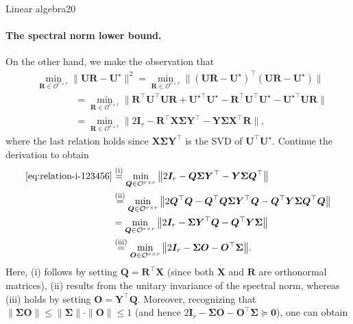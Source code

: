 \documentclass{article}
\begin{document}
\begin{problem}{Linear algebra}{20}
{\paragraph{The spectral norm lower bound.}
On the other hand, we make the observation that
%
\begin{align}
	& \min_{\bm{R}\in\mathcal{O}^{r\times r}}\big\|\bm{U}\bm{R}-\bm{U}^{\star}\big\|^{2}  =\min_{\bm{R}\in\mathcal{O}^{r\times r}}\big\|(\bm{U}\bm{R}-\bm{U}^{\star})^{\top}(\bm{U}\bm{R}-\bm{U}^{\star})\big\|\nonumber \\
 & \qquad\qquad =\min_{\bm{R}\in\mathcal{O}^{r\times r}}\big\|\bm{R}^{\top}\bm{U}^{\top}\bm{U}\bm{R}+\bm{U}^{\star\top}\bm{U}^{\star}-\bm{R}^{\top}\bm{U}^{\top}\bm{U}^{\star}-\bm{U}^{\star\top}\bm{U}\bm{R}\big\|\nonumber \\
 & \qquad\qquad{=}\min_{\bm{R}\in\mathcal{O}^{r\times r}}\big\|2\bm{I}_{r}-\bm{R}^{\top}\bm{X}\bm{\Sigma}\bm{Y}^{\top}-\bm{Y}\bm{\Sigma}\bm{X}^{\top}\bm{R}\big\|,
	\label{eq:relation-i-123456}
\end{align}
%
where the last relation holds since $\bm{X}\bm{\Sigma}\bm{Y}^{\top}$ is the
SVD of $\bm{U}^{\top}\bm{U}^{\star}$. Continue the derivation to obtain
%
\begin{align}
\eqref{eq:relation-i-123456}  & \overset{(\mathrm{i})}{=}\min_{\bm{Q}\in\mathcal{O}^{r\times r}}\big\|2\bm{I}_{r}-\bm{Q}\bm{\Sigma}\bm{Y}^{\top}-\bm{Y}\bm{\Sigma}\bm{Q}^{\top}\big\|\nonumber \\
 & \overset{(\mathrm{ii})}{=}\min_{\bm{Q}\in\mathcal{O}^{r\times r}}\big\|2\bm{Q}^{\top}\bm{Q}-\bm{Q}^{\top}\bm{Q}\bm{\Sigma}\bm{Y}^{\top}\bm{Q}-\bm{Q}^{\top}\bm{Y}\bm{\Sigma}\bm{Q}^{\top}\bm{Q}\big\|\nonumber \\
 &  =\min_{\bm{Q}\in\mathcal{O}^{r\times r}}\big\|2\bm{I}_{r}-\bm{\Sigma}\bm{Y}^{\top}\bm{Q}-\bm{Q}^{\top}\bm{Y}\bm{\Sigma}\big\|\nonumber \\
 &  \overset{(\mathrm{iii})}{=}\min_{\bm{O}\in\mathcal{O}^{r\times r}}\big\|2\bm{I}_{r}-\bm{\Sigma}\bm{O}-\bm{O}^{\top}\bm{\Sigma}\big\|.\label{eq:UR-Ustar-identity}
\end{align}
%
Here, (i) follows by setting $\bm{Q}=\bm{R}^{\top}\bm{X}$
(since both $\bm{X}$ and $\bm{R}$ are orthonormal matrices), (ii)
results from the unitary invariance of the spectral norm, whereas (iii) holds
by setting $\bm{O}=\bm{Y}^{\top}\bm{Q}$. Moreover, recognizing that
$\|\bm{\Sigma}\bm{O}\|\leq\|\bm{\Sigma}\| \cdot \|\bm{O}\|\leq1$ (and hence
$2\bm{I}_{r}-\bm{\Sigma}\bm{O}-\bm{O}^{\top}\bm{\Sigma}\succeq\bm{0}$),
one can obtain
}
\end{problem}
\end{document}
